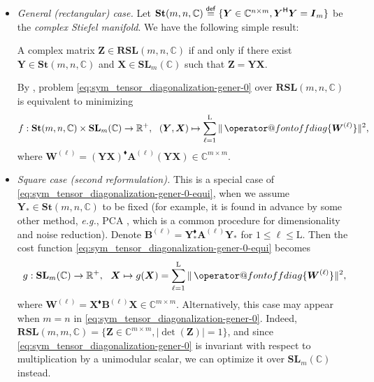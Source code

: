 \documentclass[final,onefignum,onetabnum]{siamart190516}
\makeatletter
\newcounter{example}
\newcommand{\matr}[1]{\boldsymbol{#1}}
\renewcommand{\H}{{\sf H}} %
\newcommand{\offdiag}[1]{\mathop{\operator@font offdiag}\{#1\}} %
\newcommand{\eqdef}{\stackrel{\sf def}{=}}
\newcommand{\RR}{\mathbb{R}}
\newcommand{\CC}{\mathbb{C}}
\newcommand{\matrelem}[1]{\mathrm{#1}}
\renewcommand{\H}{{\sf H}}      %
\renewcommand{\TH}{{\blacklozenge}}
\newcommand{\SL}{\mathbf{SL}}
\newcommand{\St}{\mathbf{St}}
\makeatother
\begin{document}
\begin{itemize}
\item \emph{General (rectangular) case.}
Let 
$\St(m,n,\CC) \eqdef\{\matr{Y}\in\CC^{n\times m}, \matr{Y}^{\H}\matr{Y}= \matr{I}_m\}$ 
be the \emph{complex Stiefel manifold}. 
We have the following simple result: 
\begin{lemma}\label{lem:rela-equiavalent}
A complex matrix $\matr{Z}\in\textbf{RSL}(m,n,\CC)$ if and only if there exist $\matr{Y}\in\St(m,n,\CC)$ and $\matr{X}\in\SL_{m}(\CC)$ such that $\matr{Z}=\matr{Y}\matr{X}$.
\end{lemma} 
By , problem \cref{eq:sym_tensor_diagonalization-gener-0} over $\textbf{RSL}(m,n,\CC)$ is equivalent to minimizing 
\begin{equation}\label{eq:sym_tensor_diagonalization-gener-0-equi}
f: \St(m,n,\CC)\times\SL_{m}(\CC)\rightarrow\RR^{+},\ \ (\matr{Y},\matr{X})\mapsto \sum_{\ell=1}^{\matrelem{L}} \|\offdiag{\matr{W}^{(\ell)}}\|^2,
\end{equation}
where $\matr{W}^{(\ell)}=(\matr{Y}\matr{X})^{\TH}\matr{A}^{(\ell)}(\matr{Y}\matr{X})\in\CC^{m\times m}$.


\item  \emph{Square case (second reformulation).}
This is a special case of 
\cref{eq:sym_tensor_diagonalization-gener-0-equi}, when we assume $\matr{Y}_{*}\in\St(m,n,\CC)$  to be fixed (for example, it is found in advance by some other method, \emph{e.g.}, PCA  \cite{Como92:elsevier,Como94:sp,Como10:book}, which is a common procedure for dimensionality and noise reduction). 
Denote  $\matr{B}^{(\ell)}=\matr{Y}_{*}^{\TH}\matr{A}^{(\ell)} \matr{Y}_{*}$ for $1\leq\ell\leq \matrelem{L}$.  
Then the cost function  \cref{eq:sym_tensor_diagonalization-gener-0-equi} becomes  
\begin{equation}\label{eq:sym_tensor_diagonalization-gener-1}
g: \SL_{m}(\CC)\rightarrow\RR^{+},\ \ \matr{X}\mapsto  g(\matr{X})=  \sum_{\ell=1}^{\matrelem{L}} \|\offdiag{\matr{W}^{(\ell)}}\|^2,
\end{equation}
where $\matr{W}^{(\ell)}=\matr{X}^{\TH}\matr{B}^{(\ell)} \matr{X}\in\CC^{m\times m}$. 
Alternatively, this case may appear when $m=n$ in \cref{eq:sym_tensor_diagonalization-gener-0}.
Indeed,  $\textbf{RSL}(m,m,\CC) = \{\matr{Z}\in\CC^{m\times m}, |\det(\matr{Z})| = 1\}$,
and since \cref{eq:sym_tensor_diagonalization-gener-0} is invariant with respect to multiplication by a unimodular scalar, we can optimize it over  $\SL_{m}(\CC)$ instead. 
\end{itemize}
\end{document}
